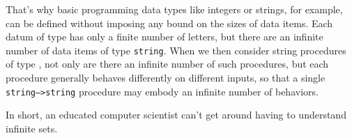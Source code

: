 That's why basic programming data types like integers or strings, for
example, can be defined without imposing any bound on the sizes of
data items.  Each datum of type  has only a
finite number of letters, but there are an infinite number of data items
of type \texttt{string}.  When we then consider string procedures of
type , not only are there
an infinite number of such procedures, but each procedure generally
behaves differently on different inputs, so that a single
\texttt{string-->string} procedure may embody an infinite number of
behaviors.

In short, an educated computer scientist can't get around having to
understand infinite sets.

\begin{problems}

\classproblems
{}






\homeworkproblems


\end{problems}

\newpage
